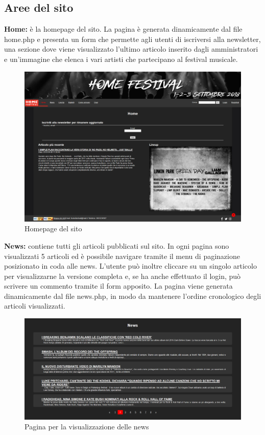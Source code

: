 \documentclass[10pt, a4paper]{article}
\begin{document}
\subsection{Aree del sito}
\textbf{Home: }è la homepage del sito. La pagina è generata dinamicamente dal file home.php e presenta un form che permette agli utenti di iscriversi alla newsletter, una sezione dove viene visualizzato l'ultimo articolo inserito dagli amministratori e un'immagine che elenca i vari artisti che partecipano al festival musicale.
\begin{figure}[h!]
  \centering
  \includegraphics[width=1\textwidth]{Images/homepage.png}
  \caption{Homepage del sito}
  \label{fig:homepage}
\end{figure}
\begin{flushleft} \textbf{News: }contiene tutti gli articoli pubblicati sul sito. In ogni pagina sono visualizzati 5 articoli ed è possibile navigare tramite il menu di paginazione posizionato in coda alle news. L'utente può inoltre cliccare su un singolo articolo per visualizzarne la versione completa e, se ha anche effettuato il login, può scrivere un commento tramite il form apposito. La pagina viene generata dinamicamente dal file news.php, in modo da mantenere l'ordine cronologico degli articoli visualizzati. \end{flushleft}
\begin{figure}[h!]
  \centering
  \includegraphics[width=1\textwidth]{Images/news.png}
  \caption{Pagina per la visualizzazione delle news}
  \label{fig:news}
\end{figure}
\end{document}
